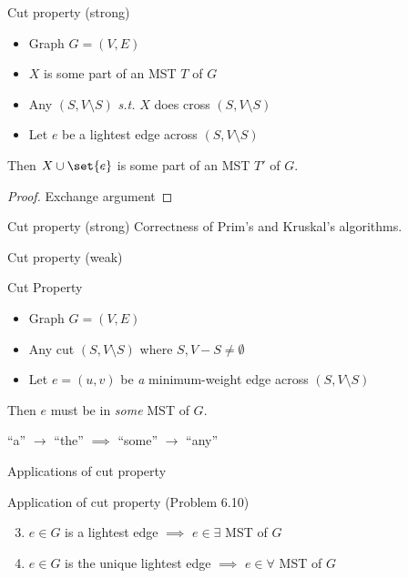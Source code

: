 
\begin{frame}{}
  \centerline{}
\end{frame}
\begin{frame}{}
  \begin{exampleblock}{Cut property (strong)}
	\begin{itemize}
	  \item Graph $G = (V, E)$
	  \item $X$ is some part of an MST $T$ of $G$
	  \item Any  $(S, V \setminus S)$ \emph{s.t.} $X$ does  cross $(S, V \setminus S)$
	 ­\item Let $e$ be a lightest edge across $(S, V \setminus S)$
	\end{itemize}
	Then $X \cup \set{e}$ is some part of an MST $T'$ of $G$.
  \end{exampleblock}

  \begin{proof}
    \centerline{Exchange argument}
  \end{proof}
\end{frame}
\begin{frame}{Cut property (strong)}
  Correctness of Prim's and Kruskal's algorithms.
\end{frame}
\begin{frame}{Cut property (weak)}
  \begin{exampleblock}{Cut Property }
    \begin{itemize}
	  \item Graph $G = (V, E)$
	  \item Any cut $(S, V \setminus S)$ where $S, V-S \neq \emptyset$
	  \item Let $e = (u,v)$ be \emph{a} minimum-weight edge across $(S, V \setminus S)$
	\end{itemize}
	Then $e$ must be in \emph{some} MST of $G$.
  \end{exampleblock}

  \begin{center}
	``a'' $\to$ ``the'' $\implies$ ``some'' $\to$ ``any''
  \end{center}
\end{frame}
\begin{frame}{Applications of cut property}
  \begin{exampleblock}{Application of cut property (Problem 6.10)}
	\begin{enumerate}[(1)]
	  \setcounter{enumi}{2}
	  \item $e \in G$ is a lightest edge $\implies$ $e \in \exists$ MST of $G$
	  \item $e \in G$ is the unique lightest edge $\implies$ $e \in \forall$ MST of $G$
	\end{enumerate}
  \end{exampleblock}
\end{frame}
